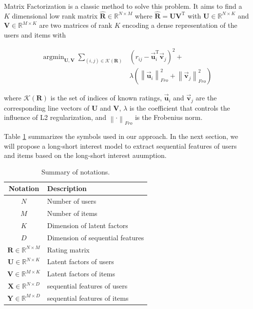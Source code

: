 \documentclass{sig-alternate-05-2015}
\DeclareMathOperator*{\argmin}{argmin}
\begin{document}
Matrix Factorization is a classic method to solve this problem.
It aims to find a $K$ dimensional low rank matrix $\mathbf{\hat{R}} \in \mathbb{R}^{N \times M}$
where $\mathbf{\hat{R}} = \mathbf{U} \mathbf{V}^\mathrm{T}$ with
$\mathbf{U} \in \mathbb{R}^{N \times K}$ and $\mathbf{V} \in \mathbb{R}^{M \times K}$
are two matrices of rank $K$ encoding a dense representation of the users and items with

\begin{equation}
\begin{aligned}
	\argmin_{\mathbf{U},\mathbf{V}}
	\sum_{(i,j) \in \mathcal{K}(\mathbf{R})}
	&( r_{ij} - \vec{\mathbf{u}}_i^{\mathrm{T}} \vec{\mathbf{v}}_j ) ^ 2 + \\
	&\lambda ( \left\| \vec{\mathbf{u}}_i \right\|_{Fro}^2 +
	\left\| \vec{\mathbf{v}}_j \right\|_{Fro}^2 )
\end{aligned}
\end{equation}

where $\mathcal{K}(\mathbf{R})$ is the set of indices of known ratings,
$\vec{\mathbf{u}}_i$ and $\vec{\mathbf{v}}_j$
are the corresponding line vectors of $\mathbf{U}$ and $\mathbf{V}$,
$\lambda$ is the coefficient that controls the influence of L2 regularization,
and $\left\| \cdot \right\|_{Fro}$ is the Frobenius norm.

Table \ref{tab:notations} summarizes the symbols used in our approach.
In the next section, we will propose a long-short interest model
to extract sequential features of users and items based on the long-short interest auumption.

\begin{table}[htpb]
    \centering
    \caption{Summary of notations.}
    \label{tab:notations}
    \begin{tabular}{|c|l|}
        \hline
        \textbf{Notation} & \textbf{Description} \\
        \hline
        $N$ & Number of users \\
        $M$ & Number of items \\
        $K$ & Dimension of latent factors \\
        $D$ & Dimension of sequential features \\
        $\mathbf{R} \in \mathbb{R}^{N \times M}$ & Rating matrix \\
        $\mathbf{U} \in \mathbb{R}^{N \times K}$ & Latent factors of users \\
        $\mathbf{V} \in \mathbb{R}^{M \times K}$ & Latent factors of items \\
        $\mathbf{X} \in \mathbb{R}^{N \times D}$ & sequential features of users \\
        $\mathbf{Y} \in \mathbb{R}^{M \times D}$ & sequential features of items \\
        \hline
    \end{tabular}
\end{table}
\end{document}
